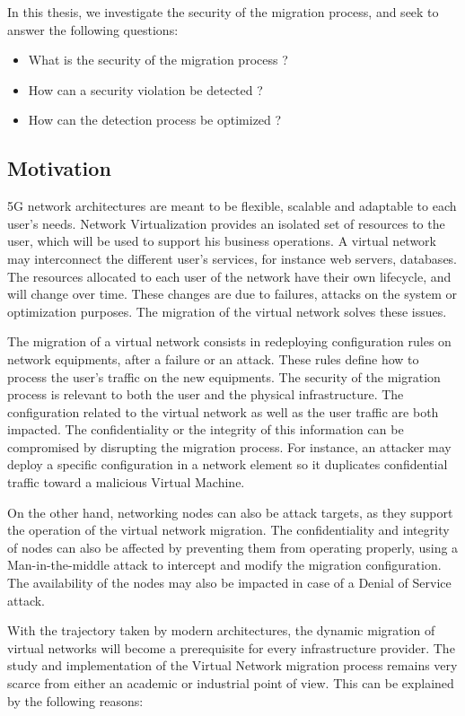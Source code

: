 In this thesis, we investigate the security of the migration process, and seek to answer the following questions:

\begin{itemize}
    \item What is the security of the migration process ?
    \item How can a security violation be detected ?
    \item How can the detection process be optimized ?
\end{itemize}

\subsection{Motivation}
5G network architectures are meant to be flexible, scalable and adaptable to each user's needs.
Network Virtualization provides an isolated set of resources to the user, which will be used to support his business operations. A virtual network may interconnect the different user's services, for instance web servers, databases. 
The resources allocated to each user of the network have their own lifecycle, and will change over time.
These changes are due to failures, attacks on the system or optimization purposes.
The migration of the virtual network solves these issues.

The migration of a virtual network consists in redeploying configuration rules on network equipments, after a failure or an attack. These rules define how to process the user's traffic on the new equipments.
The security of the migration process is relevant to both the user and the physical infrastructure.
The configuration related to the virtual network as well as the user traffic are both impacted. 
The confidentiality or the integrity of this information can be compromised by disrupting the migration process. For instance,  an attacker may deploy a specific configuration in a network element so it duplicates confidential traffic toward a malicious Virtual Machine.

On the other hand, networking nodes can also be attack targets, as they support the operation of the virtual network migration.
The confidentiality and integrity of nodes can also be affected by preventing them from operating properly, \eg using a Man-in-the-middle attack to intercept and modify the migration configuration. The availability of the nodes may also be impacted in case of a Denial of Service attack.

With the trajectory taken by modern architectures, the dynamic migration of virtual networks will become a prerequisite for every infrastructure provider.
The study and implementation of the Virtual Network migration process remains very scarce from either an academic or industrial point of view. This can be explained by the following reasons:

